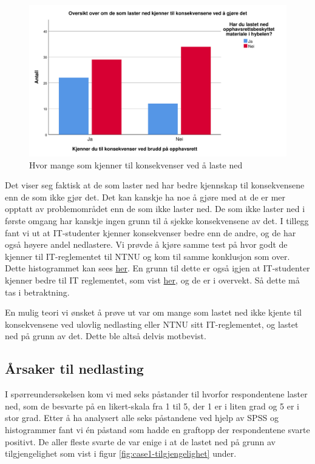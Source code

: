 \begin{figure}[H]
    \centering
    \includegraphics[scale=0.45]{case_1/bilder/konsekvens_lasterned.pdf}
    \caption[Konsekvens av å laste ned]{Hvor mange som kjenner til konsekvenser ved å laste ned}
    \label{fig:case1-konsekvens_lasterned}
\end{figure}

Det viser seg faktisk at de som laster ned har bedre kjennskap til konsekvensene enn de som ikke gjør det. Det kan kanskje ha noe å gjøre med at de er mer opptatt av problemområdet enn de som ikke laster ned. De som ikke laster ned i første omgang har kanskje ingen grunn til å sjekke konsekvensene av det. I tillegg fant vi ut at IT-studenter kjenner konsekvenser bedre enn de andre, og de har også høyere andel nedlastere. Vi prøvde å kjøre samme test på hvor godt de kjenner til IT-reglementet til NTNU \cite{ITReg} og kom til samme konklusjon som over. Dette histogrammet kan sees \hyperref[fig:reglement-lasterned]{her}. En grunn til dette er også igjen at IT-studenter kjenner bedre til IT reglementet, som vist \hyperref[fig:reglement-fakultet]{her}, og de er i overvekt. Så dette må tas i betraktning. 

En mulig teori vi ønsket å prøve ut var om mange som lastet ned ikke kjente til konsekvensene ved ulovlig nedlasting eller NTNU sitt IT-reglementet, og lastet ned på grunn av det. Dette ble altså delvis motbevist. 

\subsection{Årsaker til nedlasting}
I spørreundersøkelsen kom vi med seks påstander til hvorfor respondentene laster ned, som de besvarte på en likert-skala fra 1 til 5, der 1 er i liten grad og 5 er i stor grad. Etter å ha analysert alle seks påstandene ved hjelp av SPSS og histogrammer fant vi én påstand som hadde en graftopp der respondentene svarte positivt. De aller fleste svarte de var enige i at de lastet ned på grunn av tilgjengelighet som vist i figur \ref{fig:case1-tilgjengelighet} under.

